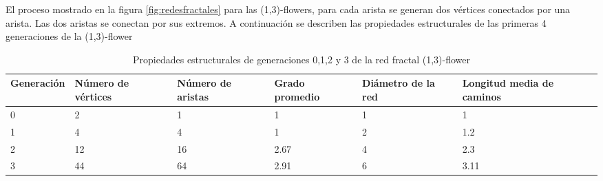 El proceso mostrado en la figura  \ref{fig:redesfractales} para las (1,3)-flowers, para cada arista se generan dos vértices conectados por una arista. Las dos aristas se conectan por sus extremos. A continuación se describen las propiedades estructurales de las primeras 4 generaciones de la (1,3)-flower

\begin{table}[H]
    \centering
    \begin{tabular}{|p{2cm}|p{2cm}|p{2cm}|p{2cm}|p{2cm}|p{3cm}|}
    \hline
        \textbf{Generación} & \textbf{Número de vértices} & \textbf{Número de aristas} & \textbf{Grado promedio} & \textbf{Diámetro de la red} & \textbf{Longitud media de caminos}\\
        \hline
        0 &2 & 1 & 1 & 1 & 1\\
        \hline
        1 &4 & 4 & 1 & 2 & 1.2\\
        \hline
        2 &12 &16 &2.67 & 4 & 2.3\\
        \hline
        3 &44 &64 & 2.91 & 6 & 3.11 \\
        \hline
    \end{tabular}
    \caption{Propiedades estructurales de generaciones  0,1,2 y 3 de la red fractal (1,3)-flower}
    \label{tab:flower13}
\end{table}

\newpage
